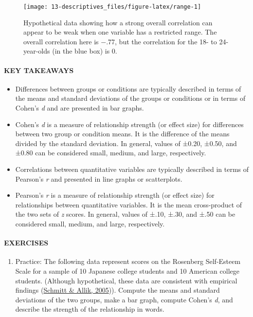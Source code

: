 \documentclass[
]{krantz}
\providecommand{\tightlist}{%
  \setlength{\itemsep}{0pt}\setlength{\parskip}{0pt}}
\begin{document}
\begin{figure}

{\centering \texttt{[image: 13-descriptives\_files/figure-latex/range-1]} 

}

\caption{Hypothetical data showing how a strong overall correlation can appear to be weak when one variable has a restricted range. The overall correlation here is −.77, but the correlation for the 18- to 24-year-olds (in the blue box) is 0.}\label{fig:range}
\end{figure}

\hypertarget{key-takeaways-35}{%
\paragraph*{KEY TAKEAWAYS}\label{key-takeaways-35}}

\begin{itemize}
\tightlist
\item
  Differences between groups or conditions are typically described in terms of the means and standard deviations of the groups or conditions or in terms of Cohen's \emph{d} and are presented in bar graphs.
\item
  Cohen's \emph{d} is a measure of relationship strength (or effect size) for differences between two group or condition means. It is the difference of the means divided by the standard deviation. In general, values of ±0.20, ±0.50, and ±0.80 can be considered small, medium, and large, respectively.
\item
  Correlations between quantitative variables are typically described in terms of Pearson's \emph{r} and presented in line graphs or scatterplots.
\item
  Pearson's \emph{r} is a measure of relationship strength (or effect size) for relationships between quantitative variables. It is the mean cross-product of the two sets of \emph{z} scores. In general, values of ±.10, ±.30, and ±.50 can be considered small, medium, and large, respectively.
\end{itemize}

\hypertarget{exercises-29}{%
\paragraph*{EXERCISES}\label{exercises-29}}

\begin{enumerate}
\def\labelenumi{\arabic{enumi}.}
\tightlist
\item
  Practice: The following data represent scores on the Rosenberg Self-Esteem Scale for a sample of 10 Japanese college students and 10 American college students. (Although hypothetical, these data are consistent with empirical findings (\protect\hyperlink{ref-schmitt2005simultaneous}{Schmitt \& Allik, 2005})). Compute the means and standard deviations of the two groups, make a bar graph, compute Cohen's \emph{d}, and describe the strength of the relationship in words.
\end{enumerate}
\end{document}
